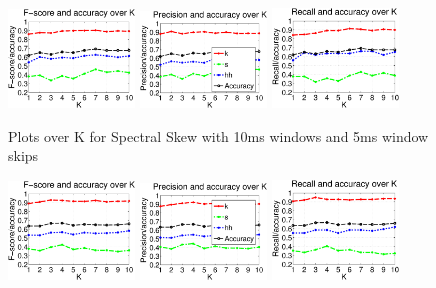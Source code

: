 {		\begin{figure}
			\centering\includegraphics[width=0.3\textwidth]{tex/appendices/test/sskew105FP.png}
			\centering\includegraphics[width=0.3\textwidth]{tex/appendices/test/sskew105_P.png}
			\centering\includegraphics[width=0.3\textwidth]{tex/appendices/test/sskew105_R.png}
				
				\caption{Plots over K for Spectral Skew with 10ms windows and 5ms window skips}
		\end{figure}
		\begin{figure}
			\centering\includegraphics[width=0.3\textwidth]{tex/appendices/test/sskew52FP.png}
			\centering\includegraphics[width=0.3\textwidth]{tex/appendices/test/sskew52_P.png}
			\centering\includegraphics[width=0.3\textwidth]{tex/appendices/test/sskew52_R.png}
				

\end{figure}}
